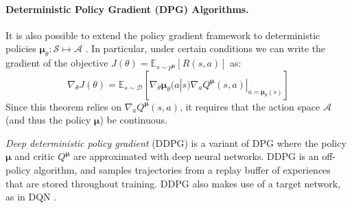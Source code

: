 \documentclass{article}
\newcommand{\comment}[1]{\textbf{\textcolor{red}{comment: #1}}}
\newcommand{\pol}[0]{\pmb{\pi}}
\newcommand{\cpol}[0]{\pmb{\mu}}
\begin{document}
\paragraph{Deterministic Policy Gradient (DPG) Algorithms.} It is also possible to extend the policy gradient framework to deterministic policies $\cpol_\theta: \mathcal{S} \mapsto \mathcal{A}$ \cite{silver2014deterministic}. In particular, under certain conditions we can write the gradient of the objective $J(\theta) = \mathbb{E}_{s \sim p^{\cpol}}[R(s,a)]$ as:
\begin{equation}
\nabla_\theta J(\theta) = \mathbb{E}_{s \sim \mathcal{D}} [\nabla_\theta \cpol_\theta(a|s) \nabla_a Q^{\cpol} (s,a)|_{a=\cpol_\theta (s)}]
\end{equation}
Since this theorem relies on $\nabla_a Q^{\cpol} (s,a)$, it requires that the action space $\mathcal{A}$ (and thus the policy $\cpol$) be continuous. 

\textit{Deep deterministic policy gradient} (DDPG) \cite{lillicrap2015continuous} is a variant of DPG where the policy $\cpol$ and critic $Q^{\cpol}$ are approximated with deep neural networks. DDPG is an off-policy algorithm, and samples trajectories from a replay buffer of experiences that are stored throughout training. DDPG also makes use of a target network, as in DQN \cite{mnih2015human}.


\end{document}
